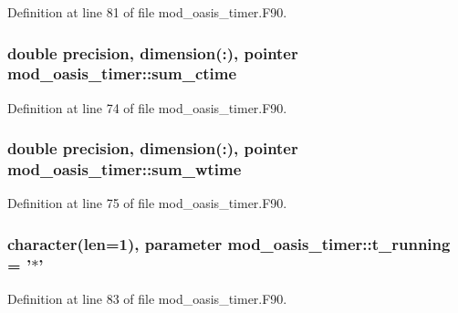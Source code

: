 Definition at line 81 of file mod\+\_\+oasis\+\_\+timer.\+F90.

\hypertarget{classmod__oasis__timer_a88e3c8171551da0ee64d10270484f6bf}{
\subsubsection[{sum\+\_\+ctime}]{\setlength{\rightskip}{0pt plus 5cm}double precision, dimension(\+:), pointer mod\+\_\+oasis\+\_\+timer\+::sum\+\_\+ctime\hspace{0.3cm}{\ttfamily [private]}}}\label{classmod__oasis__timer_a88e3c8171551da0ee64d10270484f6bf}


Definition at line 74 of file mod\+\_\+oasis\+\_\+timer.\+F90.

\hypertarget{classmod__oasis__timer_ab4d27b8be5c21939ab8d8e32d5582e9e}{
\subsubsection[{sum\+\_\+wtime}]{\setlength{\rightskip}{0pt plus 5cm}double precision, dimension(\+:), pointer mod\+\_\+oasis\+\_\+timer\+::sum\+\_\+wtime\hspace{0.3cm}{\ttfamily [private]}}}\label{classmod__oasis__timer_ab4d27b8be5c21939ab8d8e32d5582e9e}


Definition at line 75 of file mod\+\_\+oasis\+\_\+timer.\+F90.

\hypertarget{classmod__oasis__timer_a110185cdca99e2889419692182b0440a}{
\subsubsection[{t\+\_\+running}]{\setlength{\rightskip}{0pt plus 5cm}character(len=1), parameter mod\+\_\+oasis\+\_\+timer\+::t\+\_\+running = '$\ast$'\hspace{0.3cm}{\ttfamily [private]}}}\label{classmod__oasis__timer_a110185cdca99e2889419692182b0440a}


Definition at line 83 of file mod\+\_\+oasis\+\_\+timer.\+F90.

